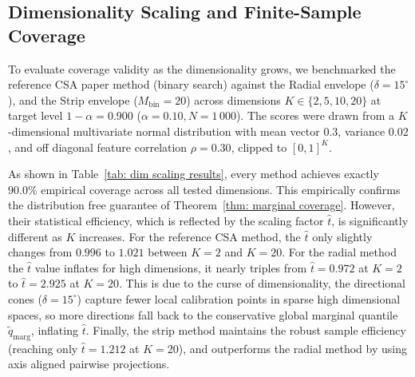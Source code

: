 

\subsection{Dimensionality Scaling and Finite-Sample Coverage}
\label{sec5.1.2: dimensionality scaling}

To evaluate coverage validity as the dimensionality grows, we benchmarked the reference CSA paper method (binary 
search) against the Radial envelope ($\delta = 15^\circ$), and the Strip envelope ($M_{\text{bin}} = 20$) across dimensions 
$K \in \{2, 5, 10, 20\}$ at target level $1-\alpha = 0.900$ ($\alpha = 0.10, N = 1\,000$). The scores were drawn from a 
$K$-dimensional multivariate normal distribution with mean vector $\mathbf{0.3}$, variance $0.02$, and off diagonal feature 
correlation $\rho = 0.30$, clipped to $[0,1]^K$.



As shown in Table~\ref{tab: dim scaling results}, every method achieves exactly $90.0\%$ empirical coverage across 
all tested dimensions. This empirically confirms the distribution free guarantee of Theorem~\ref{thm: marginal coverage}. 
However, their statistical efficiency, which is reflected by the scaling factor $\hat{t}$, is significantly different as $K$ 
increases. For the reference CSA method, the $\hat{t}$ only slightly changes from $0.996$ to $1.021$ between $K=2$ and $K=20$.
For the radial method the $\hat t$ value inflates for high dimensions, it nearly triples from $\hat{t} = 0.972$ at $K=2$ to 
$\hat{t} = 2.925$ at $K=20$. This is due to the curse of dimensionality, the directional cones ($\delta = 15^\circ$) capture 
fewer local calibration points in sparse high dimensional spaces, so more directions fall back to the conservative global 
marginal quantile $\tilde{q}_{\text{marg}}$, inflating $\hat{t}$. Finally, the strip method maintains the robust sample 
efficiency (reaching only $\hat{t} = 1.212$ at $K=20$), and outperforms the radial method by using axis aligned pairwise projections. 

